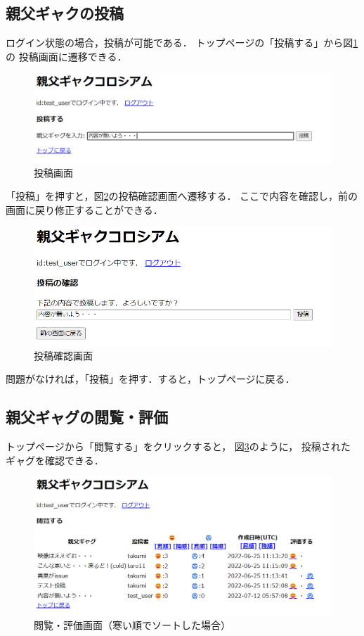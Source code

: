 \documentclass[a4paper,11pt]{jsreport}
\begin{document}
\subsection{親父ギャクの投稿}
ログイン状態の場合，投稿が可能である．
トップページの「投稿する」から図\ref{fig:post}の
投稿画面に遷移できる．
\begin{figure}[tb]
  \centering
  \includegraphics*[width=14cm]{img/post.png}
  \caption{投稿画面\label{fig:post}}
\end{figure}
「投稿」を押すと，図\ref{fig:post_confirm}の投稿確認画面へ遷移する．
ここで内容を確認し，前の画面に戻り修正することができる．
\begin{figure}[tb]
  \centering
  \includegraphics*[width=13cm]{img/post_confirm.png}
  \caption{投稿確認画面\label{fig:post_confirm}}
\end{figure}
問題がなければ，「投稿」を押す．すると，トップページに戻る．

\subsection{親父ギャグの閲覧・評価}
トップページから「閲覧する」をクリックすると，
図\ref{fig:view}のように，
投稿されたギャグを確認できる．
\begin{figure}[tb]
  \centering
  \includegraphics*[width=15cm]{img/view.png}
  \caption{閲覧・評価画面（寒い順でソートした場合）\label{fig:view}}
\end{figure}
\end{document}

